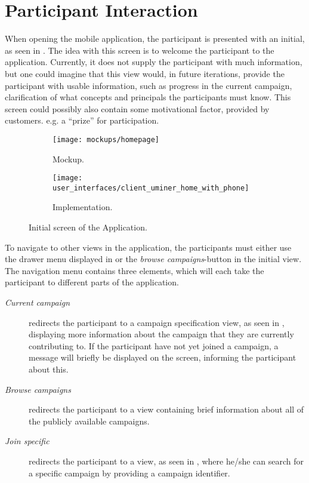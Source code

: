 
\section{Participant Interaction}
When opening the mobile application, the participant is presented with an initial, as seen in . The idea with this screen is to welcome the participant to the application. Currently, it does not supply the participant with much information, but one could imagine that this view would, in future iterations, provide the participant with usable information, such as progress in the current campaign, clarification of what concepts and principals the participants must know. This screen could possibly also contain some motivational factor, provided by customers. e.g. a ``prize'' for participation.


\begin{figure}[!htbp]
\begin{subfigure}[!t]{.48\textwidth}
  \centering
  \texttt{[image: mockups/homepage]}
  \caption{Mockup.}
  \label{fig:mockup_initial_screen}
\end{subfigure}%
\begin{subfigure}[!t]{.52\textwidth}
  \centering
  \texttt{[image: user\_interfaces/client\_uminer\_home\_with\_phone]}
  \caption{Implementation.}
  \label{fig:implementation_initial_screen}
\end{subfigure}
\caption{Initial screen of the Application.}
\label{fig:initial_screen}
\end{figure}
\FloatBarrier

To navigate to other views in the application, the participants must either use the drawer menu displayed in  or the \emph{browse campaigns}-button in the initial view. The navigation menu contains three elements, which will each take the participant to different parts of the application.

\begin{description}
	\item[\emph{Current campaign}] redirects the participant to a campaign specification view, as seen in , displaying more information about the campaign that they are currently contributing to. If the participant have not yet joined a campaign, a message will briefly be displayed on the screen, informing the participant about this.
	\item[\emph{Browse campaigns}] redirects the participant to a view containing brief information about all of the publicly available campaigns.
	\item[\emph{Join specific}] redirects the participant to a view, as seen in , where he/she can search for a specific campaign by providing a campaign identifier.
\end{description}

